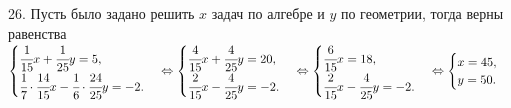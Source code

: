 26. Пусть было задано решить $x$ задач по алгебре и $y$ по геометрии, тогда верны равенства\\
$\begin{cases}\cfrac{1}{15}x+\cfrac{1}{25}y=5,\\ \cfrac{1}{7}\cdot\cfrac{14}{15}x-\cfrac{1}{6}\cdot\cfrac{24}{25}y=-2.\end{cases}\Leftrightarrow
\begin{cases}\cfrac{4}{15}x+\cfrac{4}{25}y=20,\\ \cfrac{2}{15}x-\cfrac{4}{25}y=-2.\end{cases}\Leftrightarrow
\begin{cases}\cfrac{6}{15}x=18,\\ \cfrac{2}{15}x-\cfrac{4}{25}y=-2.\end{cases}\Leftrightarrow
\begin{cases} x=45,\\ y=50.\end{cases}$\\
